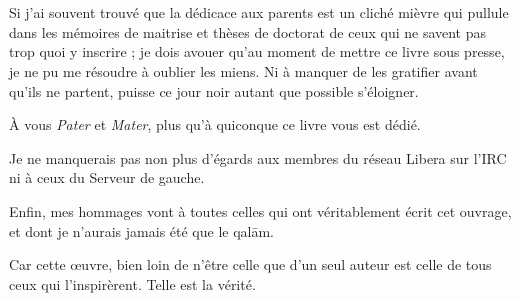 \documentclass[a5paper,10pt,twoside,french]{book}
\begin{document}
{
\thispagestyle{empty}
\chapter*{}
\thispagestyle{empty}

  \null\vfill           %

    \begin{flushright}
      \begin{minipage}[t]{0.6\textwidth}%
        \em
        \small

        Si j’ai souvent trouvé que la dédicace aux parents est un cliché mièvre qui pullule dans les mémoires de maitrise et thèses de doctorat de ceux qui ne savent pas trop quoi y inscrire ; je dois avouer qu’au moment de mettre ce livre sous presse, je ne pu me résoudre à oublier les miens. Ni à manquer de les gratifier avant qu’ils ne partent, puisse ce jour noir autant que possible  s’éloigner.

        À vous \emph{Pater} et \emph{Mater}, plus qu’à quiconque ce livre vous est dédié.

        Je ne manquerais pas non plus d’égards aux membres du réseau Libera sur l’IRC ni à ceux du Serveur de gauche.

        Enfin, mes hommages vont à toutes celles qui ont véritablement écrit cet ouvrage, et dont je n’aurais jamais été que le qalām.

        Car cette œuvre, bien loin de n’être celle que d’un seul auteur est celle de tous ceux qui l’inspirèrent. Telle est la vérité.
      \end{minipage}%
    \end{flushright}

  \null\vfill\null                %
}

  \mainmatter

  \backmatter
  \cleardoublepage

  \tableofcontents

  \printendnotes

  \printindex

  \printindex[rhymes]
\end{document}
